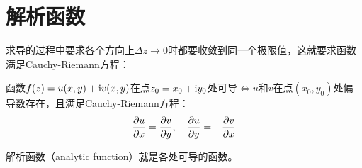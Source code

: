 \chapter{解析函数}

求导的过程中要求各个方向上\(\Delta z \to 0\)时都要收敛到同一个极限值，这就要求函数满足Cauchy-Riemann方程：
\begin{theorem}
    函数\(f(z)=u(x,y)+\mathrm{i} v(x,y)\)在点\(z_{0}=x_{0}+\mathrm{i} y_{0}\)处可导\(\iff
    \)\(u\)和\(v\)在点\((x_{0},y_{0})\)处偏导数存在，且满足Cauchy-Riemann方程：
    \[
        \pdv{u}{x}=\pdv{v}{y},\quad \pdv{u}{y}=-\pdv{v}{x}
    \]
\end{theorem}

解析函数（analytic function）就是各处可导的函数。

